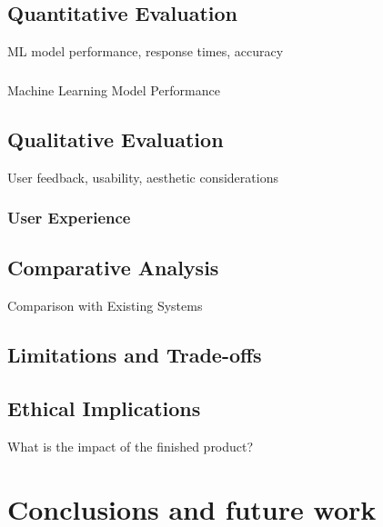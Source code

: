         \subsection{Quantitative Evaluation}
            \begin{temp}
                ML model performance, response times, accuracy
            \end{temp}
    
            \subsubsection{}{Machine Learning Model Performance}
    
        \subsection{Qualitative Evaluation}
            \begin{temp}
                User feedback, usability, aesthetic considerations
            \end{temp}
        
            \subsubsection{User Experience}
            
        \subsection{Comparative Analysis}
            \begin{temp}
                Comparison with Existing Systems
            \end{temp}
    
        \subsection{Limitations and Trade-offs}
    
        \subsection{Ethical Implications}
            \begin{temp}
                What is the impact of the finished product?
            \end{temp}
    
    \section{Conclusions and future work} %
